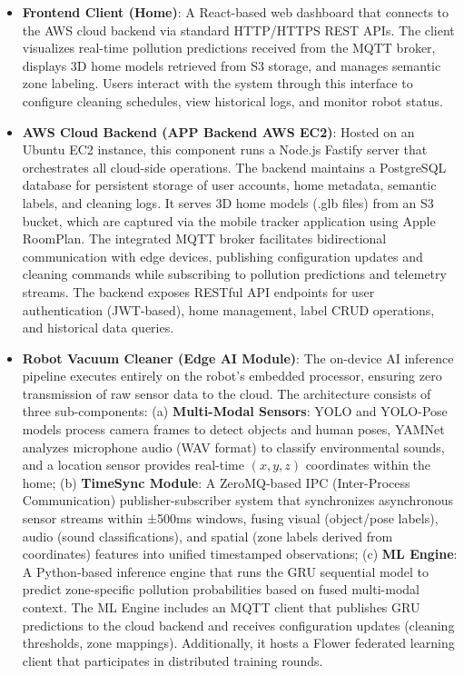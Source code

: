 \documentclass[conference]{IEEEtran}
\begin{document}
\begin{itemize}
    \item \textbf{Frontend Client (Home)}: A React-based web dashboard that connects to the AWS cloud backend via standard HTTP/HTTPS REST APIs. The client visualizes real-time pollution predictions received from the MQTT broker, displays 3D home models retrieved from S3 storage, and manages semantic zone labeling. Users interact with the system through this interface to configure cleaning schedules, view historical logs, and monitor robot status.

    \item \textbf{AWS Cloud Backend (APP Backend AWS EC2)}: Hosted on an Ubuntu EC2 instance, this component runs a Node.js Fastify server that orchestrates all cloud-side operations. The backend maintains a PostgreSQL database for persistent storage of user accounts, home metadata, semantic labels, and cleaning logs. It serves 3D home models (.glb files) from an S3 bucket, which are captured via the mobile tracker application using Apple RoomPlan. The integrated MQTT broker facilitates bidirectional communication with edge devices, publishing configuration updates and cleaning commands while subscribing to pollution predictions and telemetry streams. The backend exposes RESTful API endpoints for user authentication (JWT-based), home management, label CRUD operations, and historical data queries.

    \item \textbf{Robot Vacuum Cleaner (Edge AI Module)}: The on-device AI inference pipeline executes entirely on the robot's embedded processor, ensuring zero transmission of raw sensor data to the cloud. The architecture consists of three sub-components: (a) \textbf{Multi-Modal Sensors}: YOLO and YOLO-Pose models process camera frames to detect objects and human poses, YAMNet analyzes microphone audio (WAV format) to classify environmental sounds, and a location sensor provides real-time $(x, y, z)$ coordinates within the home; (b) \textbf{TimeSync Module}: A ZeroMQ-based IPC (Inter-Process Communication) publisher-subscriber system that synchronizes asynchronous sensor streams within ±500ms windows, fusing visual (object/pose labels), audio (sound classifications), and spatial (zone labels derived from coordinates) features into unified timestamped observations; (c) \textbf{ML Engine}: A Python-based inference engine that runs the GRU sequential model to predict zone-specific pollution probabilities based on fused multi-modal context. The ML Engine includes an MQTT client that publishes GRU predictions to the cloud backend and receives configuration updates (cleaning thresholds, zone mappings). Additionally, it hosts a Flower federated learning client that participates in distributed training rounds.


\end{itemize}
\end{document}
